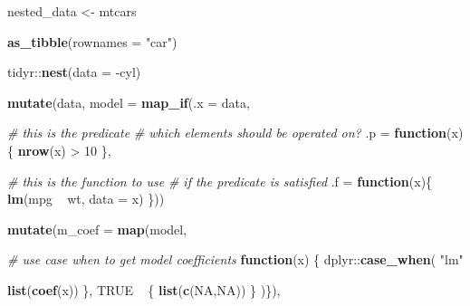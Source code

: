 \documentclass[]{book}
\newenvironment{Shaded}{}{}
\newcommand{\CommentTok}[1]{\textcolor[rgb]{0.38,0.63,0.69}{\textit{#1}}}
\newcommand{\ControlFlowTok}[1]{\textcolor[rgb]{0.00,0.44,0.13}{\textbf{#1}}}
\newcommand{\DataTypeTok}[1]{\textcolor[rgb]{0.56,0.13,0.00}{#1}}
\newcommand{\DecValTok}[1]{\textcolor[rgb]{0.25,0.63,0.44}{#1}}
\newcommand{\KeywordTok}[1]{\textcolor[rgb]{0.00,0.44,0.13}{\textbf{#1}}}
\newcommand{\NormalTok}[1]{#1}
\newcommand{\OperatorTok}[1]{\textcolor[rgb]{0.40,0.40,0.40}{#1}}
\newcommand{\OtherTok}[1]{\textcolor[rgb]{0.00,0.44,0.13}{#1}}
\newcommand{\StringTok}[1]{\textcolor[rgb]{0.25,0.44,0.63}{#1}}
\begin{document}
\begin{Shaded}
\begin{Highlighting}[]
\NormalTok{nested_data <-}
\StringTok{  }\NormalTok{mtcars }\OperatorTok{%
\StringTok{  }\KeywordTok{as_tibble}\NormalTok{(}\DataTypeTok{rownames =} \StringTok{"car"}\NormalTok{) }\OperatorTok{%
\StringTok{  }\NormalTok{tidyr}\OperatorTok{::}\KeywordTok{nest}\NormalTok{(}\DataTypeTok{data =} \OperatorTok{-}\NormalTok{cyl) }\OperatorTok{%
\StringTok{  }\KeywordTok{mutate}\NormalTok{(data,}
         \DataTypeTok{model =} \KeywordTok{map_if}\NormalTok{(}\DataTypeTok{.x =}\NormalTok{ data,}
                        
                        \CommentTok{# this is the predicate}
                        \CommentTok{# which elements should be operated on?}
                        \DataTypeTok{.p =} \ControlFlowTok{function}\NormalTok{(x)\{}
                          \KeywordTok{nrow}\NormalTok{(x) }\OperatorTok{>}\StringTok{ }\DecValTok{10}
\NormalTok{                        \},}
                        
                        \CommentTok{# this is the function to use}
                        \CommentTok{# if the predicate is satisfied}
                        \DataTypeTok{.f =} \ControlFlowTok{function}\NormalTok{(x)\{}
                          \KeywordTok{lm}\NormalTok{(mpg }\OperatorTok{~}\StringTok{ }\NormalTok{wt, }\DataTypeTok{data =}\NormalTok{ x)}
\NormalTok{                        \})) }\OperatorTok{%
\StringTok{  }
\StringTok{  }\KeywordTok{mutate}\NormalTok{(}\DataTypeTok{m_coef =} \KeywordTok{map}\NormalTok{(model,}
                      
                      \CommentTok{# use case when to get model coefficients}
                      \ControlFlowTok{function}\NormalTok{(x) \{}
\NormalTok{                        dplyr}\OperatorTok{::}\KeywordTok{case_when}\NormalTok{(}
                          \StringTok{"lm"} \OperatorTok{%
                            \KeywordTok{list}\NormalTok{(}\KeywordTok{coef}\NormalTok{(x))}
\NormalTok{                          \},}
                          \OtherTok{TRUE} \OperatorTok{~}\StringTok{ }\NormalTok{\{}
                            \KeywordTok{list}\NormalTok{(}\KeywordTok{c}\NormalTok{(}\OtherTok{NA}\NormalTok{,}\OtherTok{NA}\NormalTok{))}
\NormalTok{                          \}}
\NormalTok{                        )\}), }
         
}}}}}
\end{Highlighting}
\end{Shaded}
\end{document}
